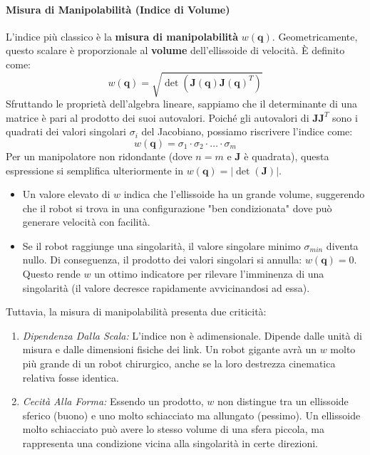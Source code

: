 ﻿\documentclass[11pt, a4paper]{article}
\begin{document}
\paragraph{Misura di Manipolabilità (Indice di Volume)}
L'indice più classico è la \textbf{misura di manipolabilità} $w(\bm{q})$. Geometricamente, questo scalare è proporzionale al \textbf{volume} dell'ellissoide di velocità. È definito come:
\[
    w(\bm{q}) = \sqrt{\det\left(\bm{J}(\bm{q})\bm{J}(\bm{q})^T\right)}
\]
Sfruttando le proprietà dell'algebra lineare, sappiamo che il determinante di una matrice è pari al prodotto dei suoi autovalori. Poiché gli autovalori di $\bm{J}\bm{J}^T$ sono i quadrati dei valori singolari $\sigma_i$ del Jacobiano, possiamo riscrivere l'indice come:
\[
    w(\bm{q}) = \sigma_1 \cdot \sigma_2 \cdot \dots \cdot \sigma_m
\]
Per un manipolatore non ridondante (dove $n=m$ e $\bm{J}$ è quadrata), questa espressione si semplifica ulteriormente in $w(\bm{q}) = |\det(\bm{J})|$.

\begin{itemize}
    \item Un valore elevato di $w$ indica che l'ellissoide ha un grande volume, suggerendo che il robot si trova in una configurazione "ben condizionata" dove può generare velocità con facilità.
    \item Se il robot raggiunge una singolarità, il valore singolare minimo $\sigma_{min}$ diventa nullo. Di conseguenza, il prodotto dei valori singolari si annulla: $w(\bm{q}) = 0$. Questo rende $w$ un ottimo indicatore per rilevare l'imminenza di una singolarità (il valore decresce rapidamente avvicinandosi ad essa).
\end{itemize}

Tuttavia, la misura di manipolabilità presenta due criticità:
\begin{enumerate}
    \item \textit{Dipendenza Dalla Scala:} L'indice non è adimensionale. Dipende dalle unità di misura e dalle dimensioni fisiche dei link. Un robot gigante avrà un $w$ molto più grande di un robot chirurgico, anche se la loro destrezza cinematica relativa fosse identica.
    \item \textit{Cecità Alla Forma:} Essendo un prodotto, $w$ non distingue tra un ellissoide sferico (buono) e uno molto schiacciato ma allungato (pessimo). Un ellissoide molto schiacciato può avere lo stesso volume di una sfera piccola, ma rappresenta una condizione vicina alla singolarità in certe direzioni.
\end{enumerate}
\end{document}

